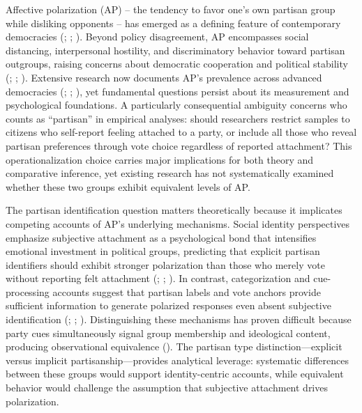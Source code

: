 \documentclass[
  12pt,
  a4paper,
  DIV=11,
  numbers=noendperiod]{scrartcl}
\begin{document}
Affective polarization (AP) -- the tendency to favor one's own partisan
group while disliking opponents -- has emerged as a defining feature of
contemporary democracies (; ; ). Beyond policy disagreement, AP encompasses social distancing,
interpersonal hostility, and discriminatory behavior toward partisan
outgroups, raising concerns about democratic cooperation and political
stability (;
;
). Extensive research now documents AP's
prevalence across advanced democracies
(;
;
), yet
fundamental questions persist about its measurement and psychological
foundations. A particularly consequential ambiguity concerns who counts
as ``partisan'' in empirical analyses: should researchers restrict
samples to citizens who self-report feeling attached to a party, or
include all those who reveal partisan preferences through vote choice
regardless of reported attachment? This operationalization choice
carries major implications for both theory and comparative inference,
yet existing research has not systematically examined whether these two
groups exhibit equivalent levels of AP.

The partisan identification question matters theoretically because it
implicates competing accounts of AP's underlying mechanisms. Social
identity perspectives emphasize subjective attachment as a psychological
bond that intensifies emotional investment in political groups,
predicting that explicit partisan identifiers should exhibit stronger
polarization than those who merely vote without reporting felt
attachment (; ;
). In contrast,
categorization and cue-processing accounts suggest that partisan labels
and vote anchors provide sufficient information to generate polarized
responses even absent subjective identification
(;
;
).
Distinguishing these mechanisms has proven difficult because party cues
simultaneously signal group membership and ideological content,
producing observational equivalence
(). The
partisan type distinction---explicit versus implicit
partisanship---provides analytical leverage: systematic differences
between these groups would support identity-centric accounts, while
equivalent behavior would challenge the assumption that subjective
attachment drives polarization.
\end{document}
